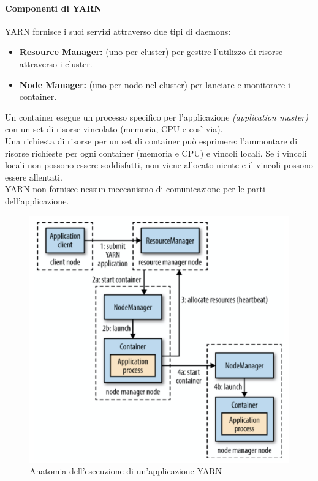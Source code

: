 \documentclass{article}
\begin{document}
\begin{appendices}
\paragraph{Componenti di YARN} YARN fornisce i suoi servizi attraverso due tipi di daemons:
\begin{itemize}
    \item \textbf{Resource Manager:} (uno per cluster) per gestire l'utilizzo di risorse attraverso i cluster.
    \item \textbf{Node Manager:} (uno per nodo nel cluster) per lanciare e monitorare i container.
\end{itemize}
Un container esegue un processo specifico per l'applicazione \textit{(application master)} con un set di risorse vincolato (memoria, CPU e così via). \\
Una richiesta di risorse per un set di container può esprimere: l'ammontare di risorse richieste per ogni container (memoria e CPU) e vincoli locali. Se i vincoli locali non possono essere soddisfatti, non viene allocato niente e il vincoli possono essere allentati. \\
YARN non fornisce nessun meccanismo di comunicazione per le parti dell'applicazione.
\begin{figure}[H]
    \centering
    \includegraphics[scale=0.2]{img/YARNRun.png}
    \caption{Anatomia dell'esecuzione di un'applicazione YARN}
\end{figure}\noindent


\end{appendices}
\end{document}
